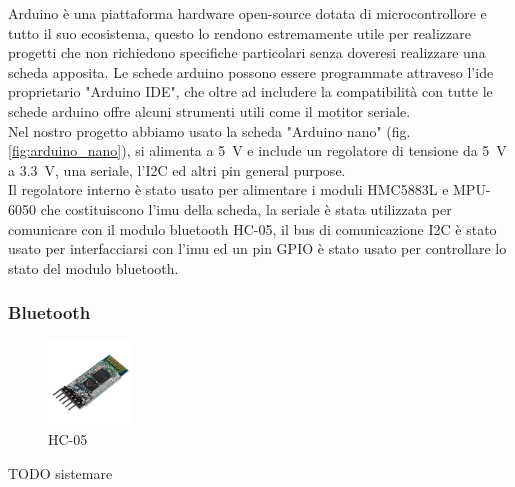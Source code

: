 \documentclass[10pt,a4paper]{article}
\begin{document}
Arduino \`e una piattaforma hardware open-source dotata di microcontrollore e tutto il suo ecosistema, questo lo rendono estremamente utile per realizzare progetti che non richiedono specifiche particolari senza doveresi realizzare una scheda apposita. Le schede arduino possono essere programmate attraveso l'ide proprietario "Arduino IDE", che oltre ad includere la compatibilit\`a con tutte le schede arduino offre alcuni strumenti utili come il motitor seriale.
%
\\
Nel nostro progetto abbiamo usato la scheda "Arduino nano" (fig.\ref{fig:arduino_nano}), si alimenta a \SI{5}{\volt} e include un regolatore di tensione da \SI{5}{\volt} a \SI{3.3}{\volt}, una seriale, l'I2C ed altri pin general purpose.
%
\\
Il regolatore interno \`e stato usato per alimentare i moduli HMC5883L e MPU-6050 che costituiscono l'imu della scheda, la seriale \`e stata utilizzata per comunicare con il modulo bluetooth HC-05, il bus di comunicazione I2C \`e stato usato per interfacciarsi con l'imu ed un pin GPIO \`e stato usato per controllare lo stato del modulo bluetooth.

\vspace{70pt}


\subsubsection{Bluetooth}
\begin{figure}
	\centering
	\vspace{-30pt}
	\includegraphics[width=0.2\textwidth]{HC-05.jpg}
	\vspace{-30pt}
	\caption{HC-05}
	\label{fig:HC-05}
\end{figure}

TODO sistemare
\\
\end{document}
